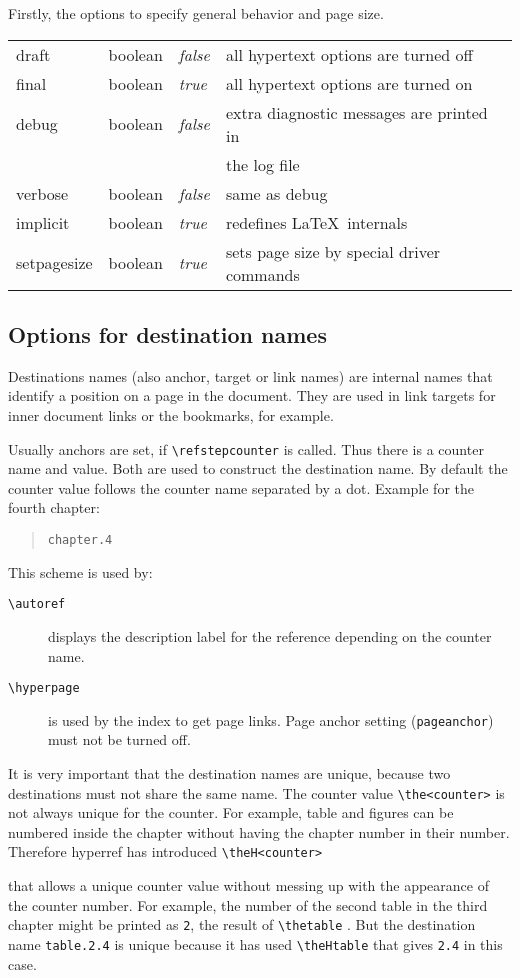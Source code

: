\documentclass{article}
\newcommand*{\cs}[1]{%
  \texttt{\textbackslash #1}%
}
\newcommand*{\xpackage}[1]{\textsf{#1}}
\begin{document}
Firstly, the options to specify general behavior and page size.

\medskip
\begin{longtable}{>{\ttfamily}ll>{\itshape}ll}
draft          & boolean & false & all hypertext options are turned off \\
final          & boolean & true  & all hypertext options are turned on \\
debug          & boolean & false & extra diagnostic messages are printed in \\
               &         &       & the log file \\
verbose        & boolean & false & same as debug \\
implicit       & boolean & true  & redefines \LaTeX\ internals \\
setpagesize    & boolean & true  & sets page size by special driver commands
\end{longtable}

\subsection{Options for destination names}

Destinations names (also anchor, target or link names) are internal
names that identify a position on a page in the document. They
are used in link targets for inner document links or the bookmarks,
for example.

Usually anchors are set, if \cs{refstepcounter} is called.
Thus there is a counter name and value. Both are used to
construct the destination name. By default the counter value
follows the counter name separated by a dot. Example for
the fourth chapter:
\begin{quote}
  \verb|chapter.4|
\end{quote}
This scheme is used by:
\begin{description}
\item[\cs{autoref}] displays the description label for the
  reference depending on the counter name.
\item[\cs{hyperpage}] is used by the index to get
page links. Page anchor setting (\verb|pageanchor|) must not
be turned off.
\end{description}

It is very important that the destination names are unique,
because two destinations must not share the same name.
The counter value \cs{the<counter>} is not always unique
for the counter. For example, table and figures can be numbered
inside the chapter without having the chapter number in their
number. Therefore \xpackage{hyperref} has introduced \cs{theH<counter>}
that allows a unique counter value without messing up with
the appearance of the counter number. For example, the number
of the second table in the third chapter might be printed
as \texttt{2}, the result of \cs{thetable}. But the
destination name \texttt{table.2.4} is unique because it
has used \cs{theHtable} that gives \verb|2.4| in this case.
\end{document}

